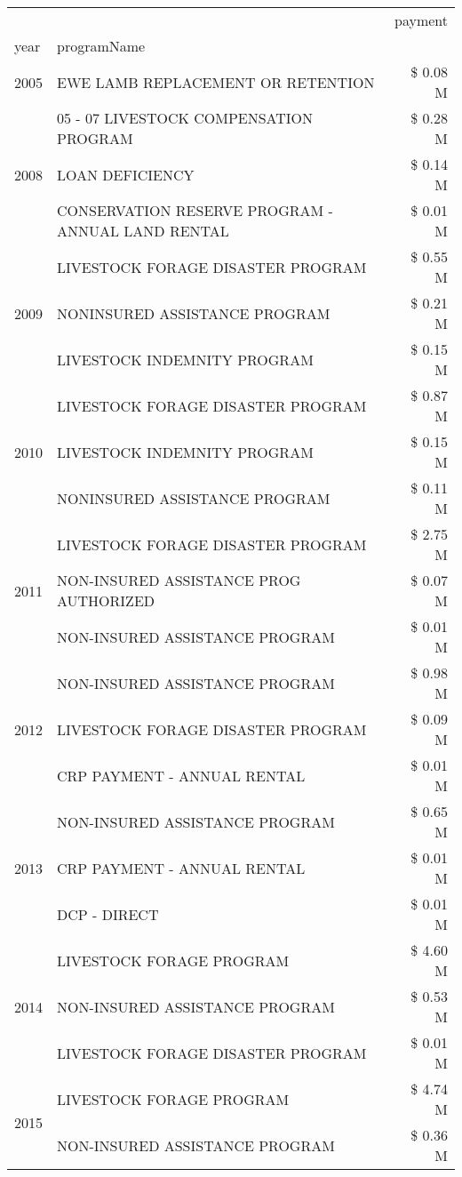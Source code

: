 \begin{tabular}{llr}
\toprule
 &  & payment \\
year & programName &  \\
\midrule
2005 & EWE LAMB REPLACEMENT OR RETENTION & \$ 0.08 M \\
\cline{1-3}
\multirow[t]{3}{*}{2008} & 05 - 07 LIVESTOCK COMPENSATION PROGRAM & \$ 0.28 M \\
 & LOAN DEFICIENCY & \$ 0.14 M \\
 & CONSERVATION RESERVE PROGRAM - ANNUAL LAND RENTAL & \$ 0.01 M \\
\cline{1-3}
\multirow[t]{3}{*}{2009} & LIVESTOCK FORAGE DISASTER  PROGRAM & \$ 0.55 M \\
 & NONINSURED ASSISTANCE PROGRAM & \$ 0.21 M \\
 & LIVESTOCK INDEMNITY PROGRAM & \$ 0.15 M \\
\cline{1-3}
\multirow[t]{3}{*}{2010} & LIVESTOCK FORAGE DISASTER PROGRAM & \$ 0.87 M \\
 & LIVESTOCK INDEMNITY PROGRAM & \$ 0.15 M \\
 & NONINSURED ASSISTANCE PROGRAM & \$ 0.11 M \\
\cline{1-3}
\multirow[t]{3}{*}{2011} & LIVESTOCK FORAGE DISASTER PROGRAM & \$ 2.75 M \\
 & NON-INSURED ASSISTANCE PROG AUTHORIZED & \$ 0.07 M \\
 & NON-INSURED ASSISTANCE PROGRAM & \$ 0.01 M \\
\cline{1-3}
\multirow[t]{3}{*}{2012} & NON-INSURED ASSISTANCE PROGRAM & \$ 0.98 M \\
 & LIVESTOCK FORAGE DISASTER PROGRAM & \$ 0.09 M \\
 & CRP PAYMENT - ANNUAL RENTAL & \$ 0.01 M \\
\cline{1-3}
\multirow[t]{3}{*}{2013} & NON-INSURED ASSISTANCE PROGRAM & \$ 0.65 M \\
 & CRP PAYMENT - ANNUAL RENTAL & \$ 0.01 M \\
 & DCP - DIRECT & \$ 0.01 M \\
\cline{1-3}
\multirow[t]{3}{*}{2014} & LIVESTOCK FORAGE PROGRAM & \$ 4.60 M \\
 & NON-INSURED ASSISTANCE PROGRAM & \$ 0.53 M \\
 & LIVESTOCK FORAGE DISASTER PROGRAM & \$ 0.01 M \\
\cline{1-3}
\multirow[t]{3}{*}{2015} & LIVESTOCK FORAGE PROGRAM & \$ 4.74 M \\
 & NON-INSURED ASSISTANCE PROGRAM & \$ 0.36 M \\

\end{tabular}
